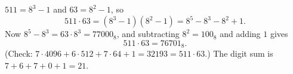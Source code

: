$511=8^3-1$ and $63=8^2-1$, so
\[511\cdot63=\left(8^3-1\right)\left(8^2-1\right)=8^5-8^3-8^2+1.\]
Now $8^5-8^3=63\cdot8^3=77000_8$, and subtracting $8^2=100_8$ and adding $1$ gives
\[511\cdot63=76701_8.\]
(Check: $7\cdot4096+6\cdot512+7\cdot64+1=32193=511\cdot63$.) The digit sum is $7+6+7+0+1=\boxed{21}$.
